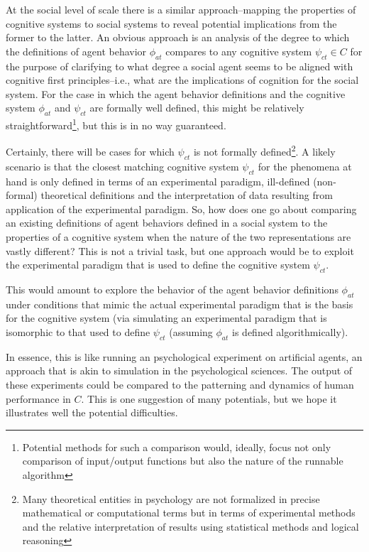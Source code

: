 \documentclass{article}
\begin{document}
At the social level of scale there is a similar approach--mapping the properties of cognitive systems to social systems to reveal potential implications from the former to the latter.  An obvious approach is an analysis of the degree to which the definitions of agent behavior $\phi_{at}$ compares to any cognitive system $\psi_{ct} \in C$ for the purpose of clarifying to what degree a social agent seems to be aligned with cognitive first principles--i.e., what are the implications of cognition for the social system.  For the case in which the agent behavior definitions and the cognitive system $\phi_{at}$ and $\psi_{ct}$ are formally well defined, this might be relatively straightforward\footnote{Potential methods for such a comparison would, ideally, focus not only comparison of input/output functions but also the nature of the runnable algorithm}, but this is in no way guaranteed. 

Certainly, there will be cases for which $\psi_{ct}$ is not formally defined\footnote{Many theoretical entities in psychology are not formalized in precise mathematical or computational terms but in terms of experimental methods and the relative interpretation of results using statistical methods and logical reasoning}.  A likely scenario is that the closest matching cognitive system $\psi_{ct}$ for the phenomena at hand is only defined in terms of an experimental paradigm, ill-defined (non-formal) theoretical definitions and the interpretation of data resulting from application of the experimental paradigm.  So, how does one go about comparing an existing definitions of agent behaviors defined in a social system to the properties of a cognitive system when the nature of the two representations are vastly different?  This is not a trivial task, but one approach would be to exploit the experimental paradigm that is used to define the cognitive system $\psi_{ct}$.  

This would amount to explore the behavior of the agent behavior definitions $\phi_{at}$ under conditions that mimic the actual experimental paradigm that is the basis for the cognitive system (via simulating an experimental paradigm that is isomorphic to that used to define $\psi_{ct}$ (assuming $\phi_{at}$ is defined algorithmically).  

In essence, this is like running an psychological experiment on artificial agents, an approach that is akin to simulation in the psychological sciences.  The output of these experiments could be compared to the patterning and dynamics of human performance in $C$.  This is one suggestion of many potentials, but we hope it illustrates well the potential difficulties.  
\end{document}
